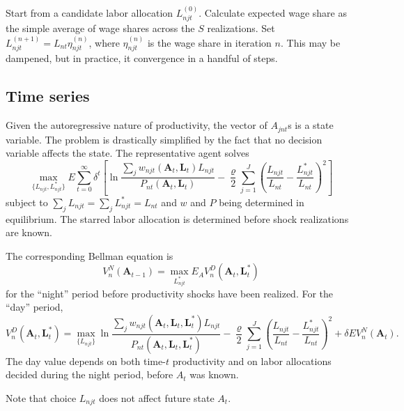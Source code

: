 \documentclass[12pt]{article}
\begin{document}
Start from a candidate labor allocation $L_{njt}^{(0)}$. Calculate expected wage share as the simple average of wage shares across the $S$ realizations. Set $L_{njt}^{(n+1)} = L_{nt}\eta_{njt}^{(n)}$, where $\eta_{njt}^{(n)}$ is the wage share in iteration $n$. This may be dampened, but in practice, it convergence in a handful of steps.

\subsection{Time series}
Given the autoregressive nature of productivity, the vector of $A_{jnt}$s is a state variable. The problem is drastically simplified by the fact that no decision variable affects the state. The representative agent solves
\[
\max_{\{L_{njt}, L_{njt}^*\}}
E
\sum_{t=0}^{\infty} 
	\delta^{t} 
	\left[
	\ln \frac 
		{\sum_j w_{njt}(\mathbf A_{t}, \mathbf L_{t})L_{njt}}
		{P_{nt}(\mathbf A_{t}, \mathbf L_{t})}
	-\frac \varrho 2
		\sum_{j=1}^J
		\left(
			\frac {L_{njt}} {L_{nt}}
			- 
			\frac {L_{njt}^*} {L_{nt}}
		\right)^2
	\right]
\]
subject to $\sum_j L_{njt}=\sum_j L_{njt}^*=L_{nt}$ and $w$ and $P$ being determined in equilibrium. The starred labor allocation is determined before shock realizations are known.

The corresponding Bellman equation is
\begin{equation}
	V_n^N(\mathbf A_{t-1}) = 
	\max_{L_{njt}^*}
	E_{A} V_n^D(\mathbf A_{t}, \mathbf L_{t}^*)
\end{equation}
for the ``night'' period before productivity shocks have been realized. For the ``day'' period,
\begin{equation}
	V_n^D(\mathbf A_{t}, \mathbf L_{t}^*) = 
	\max_{\{L_{njt}\}}
		\ln \frac 
			{\sum_j w_{njt}(\mathbf A_{t}, \mathbf L_{t}, \mathbf L_{t}^*)L_{njt}}
			{P_{nt}(\mathbf A_{t}, \mathbf L_{t}, \mathbf L_{t}^*)}
		-\frac \varrho 2
			\sum_{j=1}^J
			\left(
				\frac {L_{njt}} {L_{nt}}
				- 
				\frac {L_{njt}^*} {L_{nt}}
			\right)^2
	+ \delta E V_n^N(\mathbf A_{t}).
\end{equation}
The day value depends on both time-$t$ productivity and on labor allocations decided during the night period, before $A_t$ was known.

Note that choice $L_{njt}$ does not affect future state $A_t$.
\end{document}
